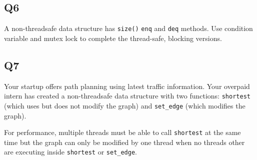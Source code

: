 \subsection{Q6}\label{q6}

A non-threadsafe data structure has \texttt{size()} \texttt{enq} and
\texttt{deq} methods. Use condition variable and mutex lock to complete
the thread-safe, blocking versions.

\begin{Shaded}
\begin{Highlighting}[]
 
\NormalTok{\}}
   
\NormalTok{\}}
\end{Highlighting}
\end{Shaded}

\subsection{Q7}\label{q7}

Your startup offers path planning using latest traffic information. Your
overpaid intern has created a non-threadsafe data structure with two
functions: \texttt{shortest} (which uses but does not modify the graph)
and \texttt{set\_edge} (which modifies the graph).

\begin{Shaded}
\begin{Highlighting}[]

  

    
  
\end{Highlighting}
\end{Shaded}

For performance, multiple threads must be able to call \texttt{shortest}
at the same time but the graph can only be modified by one thread when
no threads other are executing inside \texttt{shortest} or
\texttt{set\_edge}.

